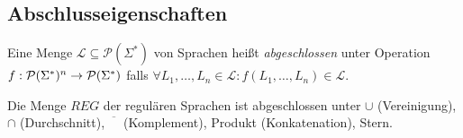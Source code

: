\subsection{Abschlusseigenschaften}
\begin{Def}[name={[Abgeschlossenheit von $\mathcal{L}$]}]
	Eine Menge $\mathcal{L}\subseteq \mathcal{P}(\Sigma^*)$ von Sprachen heißt \emph{abgeschlossen} unter Operation \\
	$f:\mathcal{P}(\Sigma^*)^n \-> \mathcal{P}(\Sigma^*)$ falls $\forall L_1,\dots, L_n\in \mathcal{L} : f(L_1,\dots, L_n)\in \mathcal{L}$.
\end{Def}
\begin{Satz}[name={[Abgeschlossenheit von $REG$]}]\label{satz:3.8}
	Die Menge $REG$ der regulären Sprachen ist abgeschlossen unter $\cup$ (Vereinigung), $\cap$ (Durchschnitt), $\overline{\phantom{X}}$ (Komplement), Produkt (Konkatenation), Stern.
\end{Satz}
